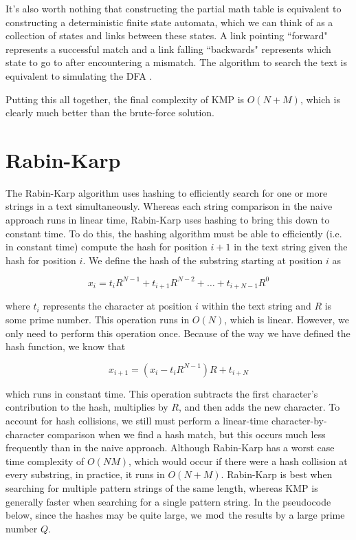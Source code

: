 \documentclass[11pt]{article}
\begin{document}
It's also worth nothing that constructing the partial math table is equivalent to constructing a deterministic finite state automata, which we can think of as a collection of states and links between these states. A link pointing ``forward" represents a successful match and a link falling ``backwards" represents which state to go to after encountering a mismatch. The algorithm to search the text is equivalent to simulating the DFA . 

Putting this all together, the final complexity of KMP is $O(N+M)$, which is clearly much better than the brute-force solution. 


\section{Rabin-Karp}
The Rabin-Karp algorithm uses hashing to efficiently search for one or more strings in a text simultaneously. Whereas each string comparison in the naive approach runs in linear time, Rabin-Karp uses hashing to bring this down to constant time. To do this, the hashing algorithm must be able to efficiently (i.e. in constant time) compute the hash for position $i+1$ in the text string given the hash for position $i$. We define the hash of the substring starting at position $i$ as

$$x_i = t_{i}R^{N-1} + t_{i+1}R^{N-2} + \ldots + t_{i+N-1}R^0$$

\noindent where $t_i$ represents the character at position $i$ within the text string and $R$ is some prime number. This operation runs in $O(N)$, which is linear. However, we only need to perform this operation once. Because of the way we have defined the hash function, we know that

$$x_{i+1} = (x_i - t_{i}R^{N-1})R + t_{i+N}$$

\noindent which runs in constant time. This operation subtracts the first character's contribution to the hash, multiplies by $R$, and then adds the new character. To account for hash collisions, we still must perform a linear-time character-by-character comparison when we find a hash match, but this occurs much less frequently than in the naive approach. Although Rabin-Karp has a worst case time complexity of $O(NM)$, which would occur if there were a hash collision at every substring, in practice, it runs in $O(N+M)$. Rabin-Karp is best when searching for multiple pattern strings of the same length, whereas KMP is generally faster when searching for a single pattern string. In the pseudocode below, since the hashes may be quite large, we $\bmod$ the results by a large prime number $Q$. 
\end{document}
